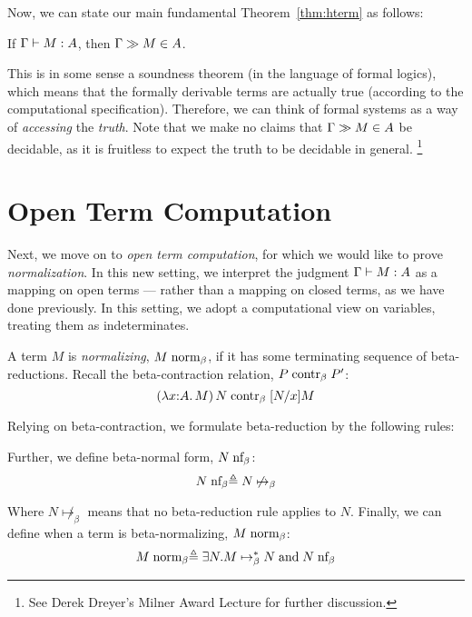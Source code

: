 \documentclass{article}
\begin{document}
Now, we can state our main fundamental Theorem~\ref{thm:hterm} as follows:

\begin{theorem}
If $\hasEF{\Gamma}{M}{A}$, then $\hasEC{\Gamma}{M}{A}$.
\end{theorem}

This is in some sense a soundness theorem (in the language of formal logics), which means that
the formally derivable terms are actually true (according to the computational
specification). Therefore, we can think of formal systems as a way of \emph{accessing} the
\emph{truth}. Note that we make no claims that $\hasEC{\Gamma}{M}{A}$ be decidable, as it is
fruitless to expect the truth to be decidable in general. \footnote{See Derek Dreyer's Milner
  Award Lecture for further discussion.}

\section{Open Term Computation}

Next, we move on to \emph{open term computation}, for which we would like to prove
\emph{normalization}.  In this new setting, we interpret the judgment $\hasEF{\Gamma}{M}{A}$ as
a mapping on open terms --- rather than a mapping on closed terms, as we have done previously.
In this setting, we adopt a computational view on variables, treating them as indeterminates.

A term $M$ is \emph{normalizing}, $M \mathrel{\text{norm}_\beta}$, if it has some terminating sequence of
beta-reductions.  Recall the beta-contraction relation, $P \mathrel{\text{contr}_\beta} P'$:
\[
(\lambda x {:} A.\, M)\,N \mathrel{\text{contr}_\beta} [N/x]M
\]

Relying on beta-contraction, we formulate beta-reduction by the following rules:


Further, we define beta-normal form, $N \mathrel{\text{nf}_\beta}$:
\[
N \mathrel{\text{nf}_\beta} \triangleq N \not\mapsto_{\beta}
\]

Where $N \not\mapsto_{\beta}$ means that no beta-reduction rule applies to $N$.  Finally, we
can define when a term is beta-normalizing, $M \mathrel{\text{norm}_\beta}$:
\[
M \mathrel{\text{norm}_\beta} \triangleq \exists N. M \mapsto_{\beta}^* N \;\text{and}\; N \mathrel{\text{nf}_\beta}
\]
\end{document}
